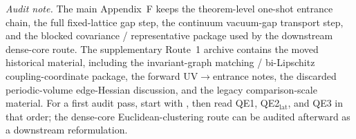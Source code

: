 \noindent\emph{Audit note.} The main Appendix~F keeps the theorem-level one-shot entrance chain, the full fixed-lattice gap step, the continuum vacuum-gap transport step, and the blocked covariance / representative package used by the downstream dense-core route.
The supplementary Route~1 archive contains the moved historical material, including the invariant-graph matching / bi-Lipschitz coupling-coordinate package, the forward UV$\to$entrance notes, the discarded periodic-volume edge-Hessian discussion, and the legacy comparison-scale material.
For a first audit pass, start with , then read QE1, QE2$_{\mathrm{lat}}$, and QE3 in that order; the dense-core Euclidean-clustering route can be audited afterward as a downstream reformulation.


